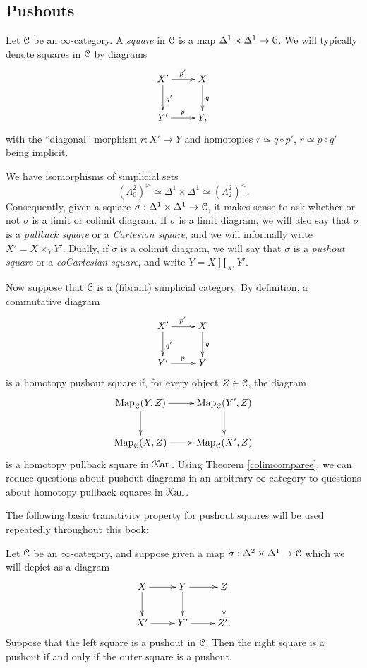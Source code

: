 \subsection{Pushouts}\label{quasilimit6}

Let $\operatorname{\mathcal{C}}$ be an $\infty$-category. A {\it square} in $\operatorname{\mathcal{C}}$ is a map
$\Delta^1 \times \Delta^1 \rightarrow \operatorname{\mathcal{C}}$. We will typically denote
squares in $\operatorname{\mathcal{C}}$ by diagrams
$$ \xymatrix{ X' \ar[r]^{p'} \ar[d]^{q'} & X \ar[d]^{q} \\
Y' \ar[r]^{p} & Y, }$$
with the ``diagonal'' morphism $r: X' \rightarrow Y$ and homotopies
$r \simeq q \circ p'$, $r \simeq p \circ q'$ being implicit.

We have isomorphisms of simplicial sets
$$ (\Lambda^2_0)^{\triangleright} \simeq \Delta^1 \times \Delta^1 \simeq (\Lambda^2_2)^{\triangleleft}.$$
Consequently, given a square $\sigma: \Delta^1 \times \Delta^1 \rightarrow \operatorname{\mathcal{C}}$, it makes sense to ask whether or not $\sigma$ is a limit or colimit diagram. If $\sigma$ is a limit diagram, we will also say that $\sigma$ is a {\it pullback square} or a {\it Cartesian square}, and we will informally write $X' = X \times_{Y} Y'$. Dually, if $\sigma$ is a colimit diagram, we will say that $\sigma$ is a {\it pushout square} or a {\it coCartesian square}, and write $Y = X \coprod_{X'} Y'$.

Now suppose that $\operatorname{\mathcal{C}}$ is a (fibrant) simplicial category. By definition, a commutative diagram
$$ \xymatrix{ X' \ar[r]^{p'} \ar[d]^{q'} & X \ar[d]^{q} \\
Y' \ar[r]^{p} & Y }$$
is a homotopy pushout square if, for every object $Z \in \operatorname{\mathcal{C}}$, the diagram
$$ \xymatrix{ \bHom_{\calC}(Y,Z) \ar[r] \ar[d] & \bHom_{\calC}(Y',Z) \ar[d] \\
\bHom_{\calC}(X,Z) \ar[r] & \bHom_{\calC}(X',Z) }$$
is a homotopy pullback square in $\operatorname{\mathcal{K}an}$. Using Theorem \ref{colimcomparee}, we can reduce questions about pushout diagrams in an arbitrary $\infty$-category to questions about homotopy pullback squares in $\operatorname{\mathcal{K}an}$.

The following basic transitivity property for pushout squares will be used repeatedly throughout this book: 

\begin{lemma}\label{transplantt}
Let $\operatorname{\mathcal{C}}$ be an $\infty$-category, and suppose given a map 
$\sigma: \Delta^2 \times \Delta^1 \rightarrow \operatorname{\mathcal{C}}$ which we will depict as a diagram
$$ \xymatrix{ X \ar[r] \ar[d] & Y \ar[d] \ar[r] & Z \ar[d] \\
X' \ar[r] & Y' \ar[r] & Z'. }$$
Suppose that the left square is a pushout in $\operatorname{\mathcal{C}}$. Then the right square is a pushout
if and only if the outer square is a pushout.
\end{lemma}

